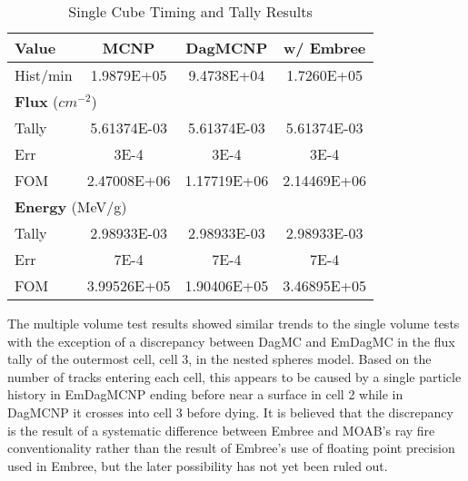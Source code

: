 \documentclass{anstrans}
\begin{document}
\begin{table}[h]

  \begin{center}
    \caption{Single Cube Timing and Tally Results}

    \begin{tabular}{lccc}
     \toprule
      Value & MCNP & DagMCNP & w/ Embree \\
     \toprule
     Hist/min & 1.9879E+05 & 9.4738E+04 & 1.7260E+05  \\
     \hline
     \multicolumn{4}{l}{\textbf{Flux} ($cm^{-2}$)} \\
     \hline
     Tally & 5.61374E-03 & 5.61374E-03 & 5.61374E-03 \\
     Err & 3E-4 & 3E-4 & 3E-4  \\
     FOM & 2.47008E+06 & 1.17719E+06 & 2.14469E+06 \\
     \hline
     \multicolumn{4}{l}{\textbf{Energy} (MeV/g)} \\
     \hline
     Tally & 2.98933E-03 & 2.98933E-03 & 2.98933E-03 \\
     Err & 7E-4 & 7E-4 & 7E-4 \\
     FOM & 3.99526E+05 & 1.90406E+05 & 3.46895E+05 \\
     \bottomrule
     
    \end{tabular}


  \end{center}
\vspace{-0.4cm}
\end{table}

The multiple volume test results showed similar trends to the single volume tests with the exception of a discrepancy between DagMC and EmDagMC in the flux tally of the outermost cell, cell 3, in the nested spheres model. Based on the number of tracks entering each cell, this appears to be caused by a single particle history in EmDagMCNP ending before near a surface in cell 2 while in DagMCNP it crosses into cell 3 before dying. It is believed that the discrepancy is the result of a systematic difference between Embree and MOAB's ray fire conventionality rather than the result of Embree's use of floating point precision used in Embree, but the later possibility has not yet been ruled out.
\end{document}
